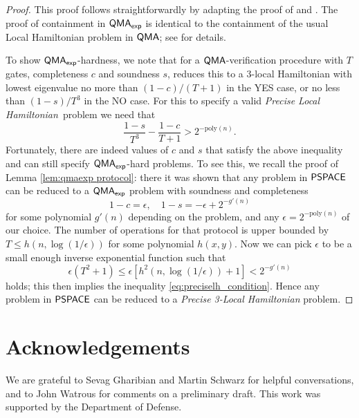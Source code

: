 \documentclass[11pt]{article}
\theoremstyle{definition}
\theoremstyle{remark}
\newcommand\QMA{{\sf{QMA}}}
\newcommand\PSPACE{{\sf{PSPACE}}}
\newcommand\QMAexp{{\sf{QMA}_{exp}}}
\newcommand\preciselh{\textit{Precise Local Hamiltonian}}
\newcommand\preciseilh[1]{\textit{Precise #1-Local Hamiltonian}}
\newcommand{\poly}{\mathrm{poly}}
\begin{document}
\begin{proof}
This proof follows straightforwardly by adapting the proof of \cite{ksv02} and \cite{kr03}. The proof of containment in $\QMAexp$ is identical to the containment of the usual Local Hamiltonian problem in $\QMA$; see \cite{ksv02} for details.

To show $\QMAexp$-hardness, we note that for a $\QMA$-verification procedure with $T$ gates, completeness $c$ and soundness $s$, \cite{kr03} reduces this to a 3-local Hamiltonian with lowest eigenvalue no more than $(1-c) / (T+1)$ in the YES case, or no less than $(1-s) / T^3$ in the NO case. For this to specify a valid \preciselh \ problem we need that
\begin{equation} \label{eq:preciselh_condition}
\frac{1-s}{T^3} - \frac{1-c}{T+1} > 2^{-\poly(n)}.
\end{equation}
Fortunately, there are indeed values of $c$ and $s$ that satisfy the above inequality and can still specify $\QMAexp$-hard problems. To see this, we recall the proof of Lemma \ref{lem:qmaexp protocol}: there it was shown that any problem in $\PSPACE$ can be reduced to a $\QMAexp$ problem with soundness and completeness
\begin{equation}
1-c = \epsilon,\quad 1 - s = -\epsilon + 2^{-g'(n)}
\end{equation}
for some polynomial $g'(n)$ depending on the problem, and any $\epsilon = 2^{-\poly(n)}$ of our choice. The number of operations for that protocol is upper bounded by $T \le h(n,\log (1/\epsilon))$ for some polynomial $h(x,y)$. Now we can pick $\epsilon$ to be a small enough inverse exponential function such that
\begin{equation}
\epsilon (T^2+1) \le \epsilon [h^2(n,\log(1/\epsilon)) +1] < 2^{-g'(n)} 
\end{equation}
holds; this then implies the inequality \ref{eq:preciselh_condition}. Hence any problem in $\PSPACE$ can be reduced to a \preciseilh{3} problem.
\end{proof}
\section{Acknowledgements}
We are grateful to Sevag Gharibian and Martin Schwarz for helpful conversations, and to John Watrous for comments on a preliminary draft. This work was supported by the Department of Defense.



\appendix
\end{document}
